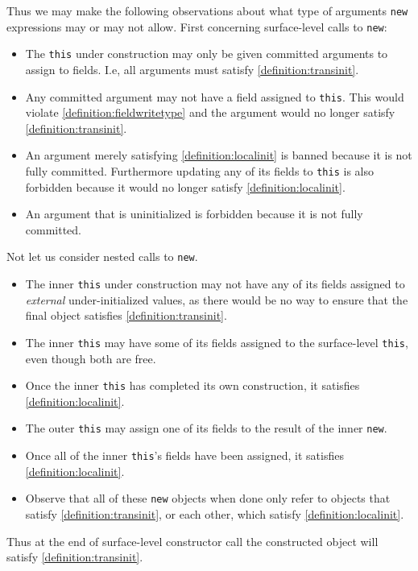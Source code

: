 \documentclass{article}
\begin{document}
Thus we may make the following observations about what type of arguments \texttt{new} expressions may or may not allow.
First concerning surface-level calls to \texttt{new}:
\begin{itemize}
\item The \texttt{this} under construction may only be given committed arguments to assign to fields. I.e, all arguments must satisfy \ref{definition:transinit}.
\item Any committed argument may not have a field assigned to \texttt{this}. This would violate \ref{definition:fieldwritetype} and the argument would no longer satisfy \ref{definition:transinit}.
\item An argument merely satisfying \ref{definition:localinit} is banned because it is not fully committed. Furthermore updating any of its fields to \texttt{this} is also forbidden because it would no longer satisfy \ref{definition:localinit}.
\item An argument that is uninitialized is forbidden because it is not fully committed.
\end{itemize}

Not let us consider nested calls to \texttt{new}.
\begin{itemize}
\item The inner \texttt{this} under construction may not have any of its fields assigned to \textit{external} under-initialized values, as there would be no way to ensure that the final object satisfies \ref{definition:transinit}.
\item The inner \texttt{this} may have some of its fields assigned to the surface-level \texttt{this}, even though both are free.
\item Once the inner \texttt{this} has completed its own construction, it satisfies \ref{definition:localinit}.
\item The outer \texttt{this} may assign one of its fields to the result of the inner \texttt{new}.
\item Once all of the inner \texttt{this}'s fields have been assigned, it satisfies \ref{definition:localinit}.
\item Observe that all of these \texttt{new} objects when done only refer to objects that satisfy \ref{definition:transinit}, or each other, which satisfy \ref{definition:localinit}.
\end{itemize}

Thus at the end of surface-level constructor call the constructed object will satisfy \ref{definition:transinit}.
\end{document}

